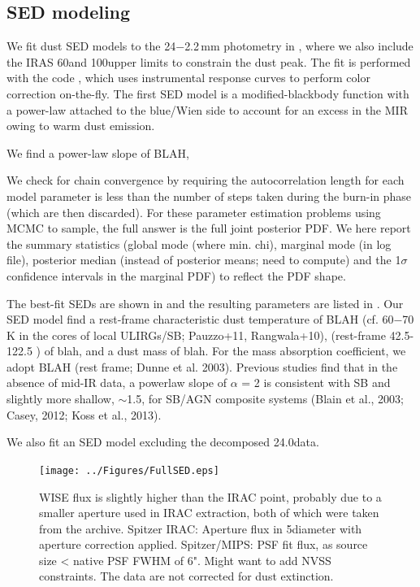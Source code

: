 \documentclass[]{emulateapj}
\begin{document}
\subsection{SED modeling} \label{sec:SED}
We fit dust SED models to the
24\micron$-$2.2\,mm photometry in , where we also
include the IRAS 60\micron and 100\micron upper limits
to constrain the dust peak.
The fit is performed with the code
 \citep[\eg][]{Dowell14a}, which
uses instrumental response curves to perform color correction on-the-fly.
The first SED model is a modified-blackbody
function with a power-law attached to the
blue/Wien side to account for an excess in the MIR owing to warm dust emission.



We find a power-law slope of BLAH,

We check for chain convergence by requiring the autocorrelation
length for each model parameter is less than the number of steps
taken during the burn-in phase (which are then discarded).
For these parameter estimation problems using MCMC to sample,
the full answer is the full joint posterior PDF.
We here report the summary statistics (global mode (where min. chi),
marginal mode (in log file),
posterior median (instead of posterior means; need to compute) and the
1$\sigma$ confidence intervals in the marginal PDF) to reflect the PDF shape.

The best-fit SEDs are shown in  and the resulting parameters
are listed in .
Our SED model find a rest-frame characteristic dust temperature of BLAH
(cf. 60$-$70\,K in the cores of local ULIRGs/SB; Pauzzo+11, Rangwala+10),
\fir (rest-frame 42.5-122.5 \micron) of blah, and a dust mass of blah.
For the mass absorption coefficient, we adopt BLAH (rest frame; Dunne et al. 2003).
Previous studies find that in the absence of mid-IR data, a powerlaw slope of $\alpha$ = 2 is consistent with SB and slightly more shallow, $\sim$1.5, for SB/AGN composite systems (Blain et al., 2003; Casey, 2012; Koss et al., 2013).

We also fit an SED model excluding the decomposed 24.0\micron data.




\begin{figure}[tbph]
\centering
\texttt{[image: ../Figures/FullSED.eps]}
\caption{
WISE flux is slightly higher than the IRAC point, probably due to a smaller
aperture used in IRAC extraction, both of which were taken from the archive.
Spitzer IRAC:
Aperture flux in 5\farcs diameter with aperture correction applied.
Spitzer/MIPS: PSF fit flux, as source size <
native PSF FWHM of 6".
Might want to add NVSS constraints.
The data are not corrected for dust extinction.
\label{fig:SED}}
\end{figure}
\end{document}
